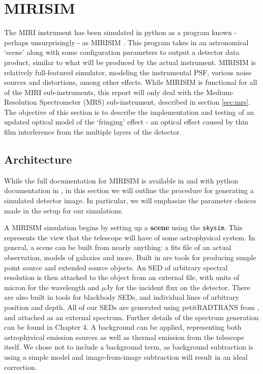 \section{MIRISIM}

The MIRI instrument has been simulated in python as a program known - perhaps unsurprisingly - as MIRISIM \parencite{ref:mirisimdocs}. 
This program takes in an astronomical `scene' along with some configuration parameters to output a detector data product, similar to what will be produced by the actual instrument.
MIRISIM is relatively full-featured simulator, modeling the instrumental PSF, various noise sources and distortions, among other effects.
While MIRISIM is functional for all of the MIRI sub-instruments, this report will only deal with the Medium-Resolution Spectrometer (MRS) sub-instrument, described in section \ref{sec:mrs}.
The objective of this section is to describe the implementation and testing of an updated optical model of the `fringing' effect - an optical effect caused by thin film interference from the multiple layers of the detector.
\subsection{Architecture}
While the full documentation for MIRISIM is available in \parencite{ref:mirisimdocs} and with python documentation in \parencite{Cossou2018}, in this section we will outline the procedure for generating a simulated detector image.
In particular, we will emphasize the parameter choices made in the setup for our simulations.

A MIRISIM simulation begins by setting up a \textbf{scene} using the \verb|skysim|. 
This represents the view that the telescope will have of some astrophysical system.
In general, a scene can be built from nearly anything: a fits file of an actual observation, models of galaxies and more. 
Built in are tools for producing simple point source and extended source objects.
An SED of arbitrary spectral resolution is then attached to the object from an external file, with units of micron for the wavelength and $\mu$Jy for the incident flux on the detector.
There are also built in tools for blackbody SEDs, and individual lines of arbitrary position and depth.
All of our SEDs are generated using petitRADTRANS from \parencite{Molliere2019}, and attached as an external spectrum.
Further details of the spectrum generation can be found in Chapter 4.
A background can be applied, representing both astrophysical emission sources as well as thermal emission from the telescope itself.
We chose not to include a background term, as background subtraction is using a simple model and image-from-image subtraction will result in an ideal correction.

